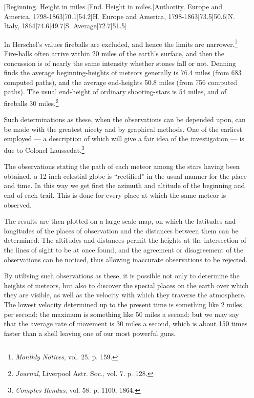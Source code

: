 \documentclass[a4paper, 12pt, oneside, polutonikogreek, english]{article}
\begin{document}
|Beginning. Height in miles.|End. Height in miles.|Authority. 
Europe and America, 1798-1863|70.1|54.2|H. 
Europe and America, 1798-1863|73.5|50.6|N. 
Italy, 1864|74.6|49.7|S. 
Average|72.7|51.5|

In Herschel's values fireballs are excluded, and hence the limits are narrower.\footnote{\emph{Monthly Notices}, vol. 25. p. 159.} Fire-balls often arrive within 20 miles of the earth's surface, and then the concussion is of nearly the same intensity whether stones fall or not. Denning finds the average beginning-heights of meteors generally is 76.4 miles (from 683 computed paths), and the average end-heights 50.8 miles (from 756 computed paths). The usual end-height of ordinary shooting-stars is 54 miles, and of fireballs 30 miles.\footnote{\emph{Journal}, Liverpool Astr. Soc., vol. 7. p. 128.}

Such determinations as these, when the observations can be depended upon, can be made with the greatest nicety and by graphical methods. One of the earliest employed --- a description of which will give a fair idea of the investigation --- is due to Colonel Laussedat.\footnote{\emph{Comptes Rendus}, vol. 58. p. 1100, 1864.}

The observations stating the path of each meteor among the stars having been obtained, a 12-inch celestial globe is ``rectified'' in the usual manner for the place and time. In this way we get first the azimuth and altitude of the beginning and end of each trail. This is done for every place at which the same meteor is observed.

The results are then plotted on a large scale map, on which the latitudes and longitudes of the places of observation and the distances between them can be determined. The altitudes and distances permit the heights at the intersection of the lines of sight to be at once found, and the agreement or disagreement of the observations can be noticed, thus allowing inaccurate observations to be rejected.

By utilising such observations as these, it is possible not only to determine the heights of meteors, but also to discover the special places on the earth over which they are visible, as well as the velocity with which they traverse the atmosphere. The lowest velocity determined up to the present time is something like 2 miles per second; the maximum is something like 50 miles a second; but we may say that the average rate of movement is 30 miles a second, which is about 150 times faster than a shell leaving one of our most powerful guns.
\clearpage
\end{document}
